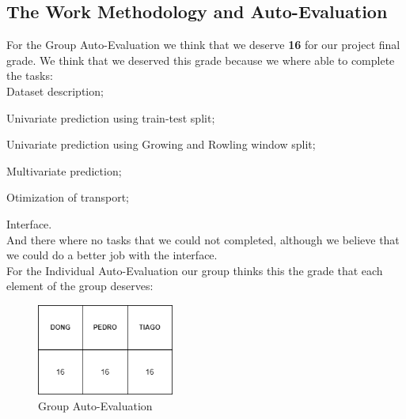 \newpage

\subsection{The Work Methodology and Auto-Evaluation}
\quad For the Group Auto-Evaluation we think that we deserve {\bfseries 16} for our project final grade. We think that we deserved this grade because we where able to complete the tasks:\\

\quad \textbullet Dataset description;

\quad \textbullet Univariate prediction using train-test split;

\quad \textbullet Univariate prediction using Growing and Rowling window split;

\quad \textbullet Multivariate prediction;

\quad \textbullet Otimization of transport;

\quad \textbullet Interface.\\

And there where no tasks that we could not completed, although we believe that we could do a better job with the interface.\\

For the Individual Auto-Evaluation our group thinks this the grade that each element of the group deserves:
\\
\begin{figure}[H]
    \centering
    \includegraphics[width=0.4\textwidth]{assets/notas.png}
    \caption{Group Auto-Evaluation}
    \label{fig:notas}
    \end{figure}